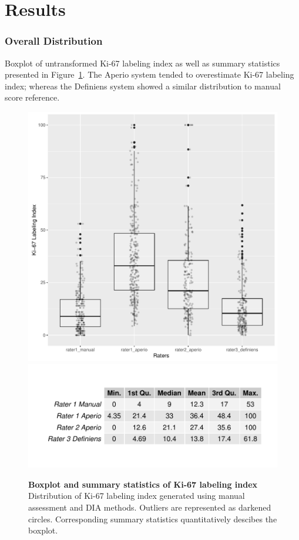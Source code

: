 \documentclass[final,1p,times]{elsarticle}
\begin{document}
\section*{Results}

\subsubsection*{Overall Distribution}
Boxplot of untransformed Ki-67 labeling index as well as summary statistics presented in Figure~\ref{boxplot}. The Aperio system tended to overestimate Ki-67 labeling index; whereas the Definiens system showed a similar distribution to manual score reference.

\begin{figure}
\includegraphics[width = \linewidth]{boxplot}
\includegraphics[width = \linewidth]{boxStat}

\centering
\caption{{\bf Boxplot and summary statistics of Ki-67 labeling index}
Distribution of Ki-67 labeling index generated using manual assessment and DIA methods. Outliers are represented as darkened circles. Corresponding summary statistics quantitatively descibes the boxplot.
}
\label{boxplot}
\end{figure}
\end{document}
